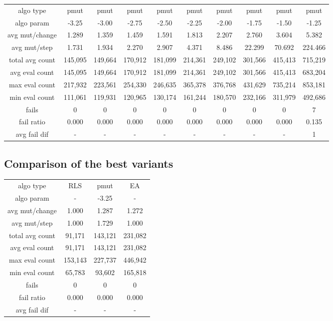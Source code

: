 \begin{tabular}[h]{cccccccccc}
algo type&           pmut&    pmut&    pmut&    pmut&    pmut&    pmut&    pmut&    pmut&    pmut\\
algo param&         -3.25&   -3.00&   -2.75&   -2.50&   -2.25&   -2.00&   -1.75&   -1.50&   -1.25\\
avg mut/change&     1.289&   1.359&   1.459&   1.591&   1.813&   2.207&   2.760&   3.604&   5.382\\
avg mut/step&       1.731&   1.934&   2.270&   2.907&   4.371&   8.486&  22.299&  70.692& 224.466\\
\hline
total avg count&  145,095& 149,664& 170,912& 181,099& 214,361& 249,102& 301,566& 415,413& 715,219\\
avg eval count&   145,095& 149,664& 170,912& 181,099& 214,361& 249,102& 301,566& 415,413& 683,204\\
max eval count&   217,932& 223,561& 254,330& 246,635& 365,378& 376,768& 431,629& 735,214& 853,181\\
min eval count&   111,061& 119,931& 120,965& 130,174& 161,244& 180,570& 232,166& 311,979& 492,686\\
\hline
fails&                  0&       0&       0&       0&       0&       0&       0&       0&       7\\
fail ratio&         0.000&   0.000&   0.000&   0.000&   0.000&   0.000&   0.000&   0.000&   0.135\\
avg fail dif&           -&       -&       -&       -&       -&       -&       -&       -&       1\\
\end{tabular}


\subsection{Comparison of the best variants}


\begin{tabular}[h]{cccc}
algo type&            RLS&    pmut&      EA\\
algo param&             -&   -3.25&       -\\
avg mut/change&     1.000&   1.287&   1.272\\
avg mut/step&       1.000&   1.729&   1.000\\
\hline
total avg count&   91,171& 143,121& 231,082\\
avg eval count&    91,171& 143,121& 231,082\\
max eval count&   153,143& 227,737& 446,942\\
min eval count&    65,783&  93,602& 165,818\\
\hline
fails&                  0&       0&       0\\
fail ratio&         0.000&   0.000&   0.000\\
avg fail dif&           -&       -&       -\\
\end{tabular}

